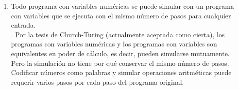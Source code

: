 \documentclass[12pt]{article}
\begin{document}
\begin{ejercicio}[2.4 puntos]
\begin{enumerate}
            \item Todo programa con variables numéricas se puede simular con un programa con variables que se ejecuta con el 
            mismo número de pasos para cualquier entrada. \\

            . Por la tesis de Church-Turing (actualmente aceptada como cierta), los programas con variables numéricas y los programas con variables 
            son equivalentes en poder de cálculo, es decir, pueden simularse mutuamente. Pero la simulación no tiene por qué conservar 
            el mismo número de pasos. Codificar números como palabras y simular operaciones aritméticas puede requerir varios pasos por 
            cada paso del programa original. 
        \end{enumerate}
    \end{ejercicio}

    \newpage
\end{document}
